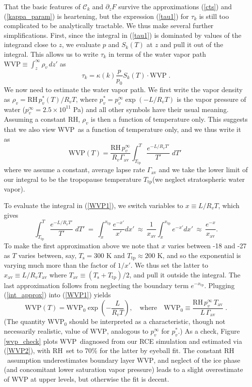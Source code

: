 \documentclass[10pt]{article}
\newcommand{\beqn}{\begin{equation}}
\newcommand{\eeqn}{\end{equation}}
\newcommand{\eqnref}[1]{(\ref{#1})}
\newcommand{\ppz}{\ensuremath{\partial_z}}
\newcommand{\FLW}{\ensuremath{F}}
\newcommand{\cool}{\ensuremath{\mathcal{C}}}
\newcommand{\Tav}{\ensuremath{T_\mathrm{av}}}
\newcommand{\Ts}{\ensuremath{T_\mathrm{s}}}
\newcommand{\RH}{\ensuremath{\mathrm{RH}}}
\newcommand{\WVP}{\ensuremath{\mathrm{WVP}}}
\newcommand{\Ttp}{\ensuremath{T_\mathrm{tp}}}
\newcommand{\gammaav}{\ensuremath{\Gamma_\mathrm{av}}}
\begin{document}
That the basic features of $\cool_k$  and $\ppz \FLW$ survive the approximations \eqnref{cts} and \eqnref{kappa_param} is heartening, but the expression \eqnref{tau1} for $\tau_k$ is still too complicated to be analytically tractable. We thus make several further simplifications.  First, since the integral in \eqnref{tau1} is dominated by values of the integrand close to $z$, we evaluate $p$ and $S_k(T)$ at $z$ and pull it out of the integral. This allows us to write $\tau_k$ in terms of the water vapor path $\WVP\equiv \int_z^\infty  \rho_v\, dz'$ as
	\beqn
		\tau_k =  \kappa(k) \frac{p}{p_0} S_k(T)\cdot \WVP \; .
	\label{tauWVP}
	\eeqn
We now need to estimate the water vapor path. We first write the vapor density as 
$\rho_v =  \RH\, p_v^*(T)/R_ vT$, where $p_v^* = p_v^\infty \exp(-L/R_vT)$ is the vapor pressure of water ($p_v^\infty = 2.5\times 10^{11} $ Pa) and all other symbols have their usual meaning. Assuming a constant  \RH,  $\rho_v$ is then a function of temperature only. This suggests that we also view \WVP\ as a function of temperature only, and we thus write it as 
	\beqn
		\WVP(T) =\frac{ \RH\, p_v^\infty}{R_v \gammaav}\int^T_{\Ttp} \frac{e^{-L/R_v T'}}{T'}\; dT' \; 
	\label{WVP1}
	\eeqn	
where we assume a constant, average lapse rate $\gammaav$ and we take the lower limit of our integral to be the tropopause temperature \Ttp (we neglect stratospheric water vapor). 

To evaluate the integral in \eqnref{WVP1}, we switch variables to $x\equiv L/R_v T$, which gives
	\beqn
		\int^T_{\Ttp} \frac{e^{-L/R_v T'}}{T'}\; dT' \ = \ \int_x^{x_\mathrm{tp}} \frac{e^{-x'}}{x'} dx' \ \approx\ \frac{1}{x_{\mathrm{av}}}\int_x^{x_\mathrm{tp}} e^{-x'} dx' \ \approx\ \frac{e^{-x}}{x_{\mathrm{av}}}.
		\label{int_approx}
	\eeqn
To make the first approximation above we note that $x$ varies between -18 and -27 as $T$ varies between, say, $\Ts=300$ K and $\Ttp \approx 200$ K, and so the exponential is varying much more than the factor of $1/x'$. We thus set the latter  to $x_{\mathrm{av}}\equiv L/R_v \Tav$ where $\Tav \equiv (\Ts + \Ttp)/2$, and pull it outside the integral. The last approximation follows from neglecting the boundary term $e^{-x_\mathrm{tp}}$. Plugging \eqnref{int_approx} into \eqnref{WVP1} yields
	\beqn
		\WVP(T) =\WVP_0\exp\left(-\frac{L}{R_vT}\right),\quad \mbox{where}\quad  \WVP_0 \equiv \frac{\RH\, p_v^\infty\, \Tav}{L\,\gammaav} \; .
	\label{WVP2}
	\eeqn
(The quantity $\WVP_0$ should be interpreted as a characteristic, though not necessarily realistic, value of \WVP, analogous to $p_v^\infty$ for $p_v^*$.)  As a  check, Figure \ref{wvp_check} plots \WVP\ diagnosed from our RCE simulation and estimated via \eqnref{WVP2}, with \RH\ set to 70\% for the latter by eyeball fit. The constant \RH\ assumption underestimates boundary layer \WVP, and neglect of the ice phase (and concomitant lower saturation vapor pressure) leads to a slight overestimate of WVP at upper levels, but otherwise the fit is decent.
\end{document}

